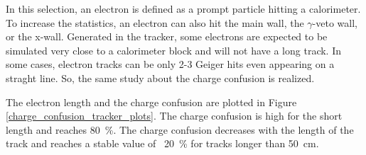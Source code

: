 \documentclass[main.tex]{subfiles}
\begin{document}
\noindent In this selection, an electron is defined as a prompt particle hitting a calorimeter. To increase the statistics, an electron can also hit the main wall, the $\gamma$-veto wall, or the x-wall. Generated in the tracker, some electrons are expected to be simulated very close to a calorimeter block and will not have a long track. In some cases, electron tracks can be only 2-3 Geiger hits even appearing on a straght line. So, the same study about the charge confusion is realized.


\bigskip


\noindent The electron length and the charge confusion are plotted in Figure \ref{charge_confusion_tracker_plots}. The charge confusion is high for the short length and reaches 80~\%. The charge confusion decreases with the length of the track and reaches a stable value of ~20~\% for tracks longer than 50~cm.
\end{document}
